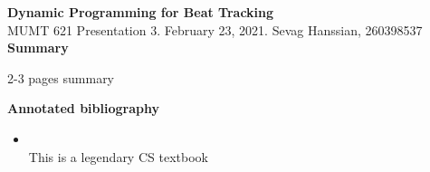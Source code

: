 \documentclass[letter,12pt]{report}
\begin{document}
\Large{\textbf{Dynamic Programming for Beat Tracking}}\\
\large{MUMT 621 Presentation 3. February 23, 2021. Sevag Hanssian, 260398537}\\

\Large{\textbf{Summary}}

2-3 pages summary

\vfill
\clearpage

\Large{\textbf{Annotated bibliography}}\\

\begin{itemize}
	\vspace{-1em}
	\item
		\\
		This is a legendary CS textbook
\end{itemize}
\end{document}
